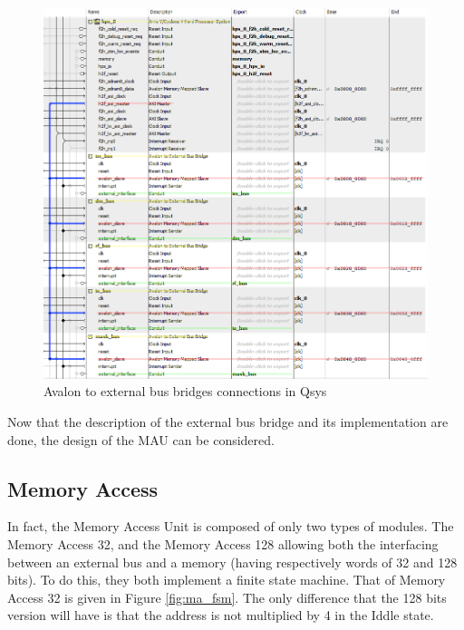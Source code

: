 \begin{figure}[H]
    \center
    \includegraphics[width=\linewidth]{"Chapter4-MAU_CTRLU/res/qsys_mau.PNG"}
    \caption{Avalon to external bus bridges connections in Qsys}
    \label{fig:avalon/bus}
\end{figure}

Now that the description of the external bus bridge and its implementation are done, the design of 
the MAU can be considered.

\subsection{Memory Access}

In fact, the Memory Access Unit is composed of only two types of modules. The Memory Access 32, and 
the Memory Access 128 allowing both the interfacing between an external bus and a memory (having 
respectively words of 32 and 128 bits). To do this, they both implement a finite state machine. 
That of Memory Access 32 is given in Figure \ref{fig:ma_fsm}. The only difference that the 128 bits version will 
have is that the address is not multiplied by 4 in the Iddle state. 

